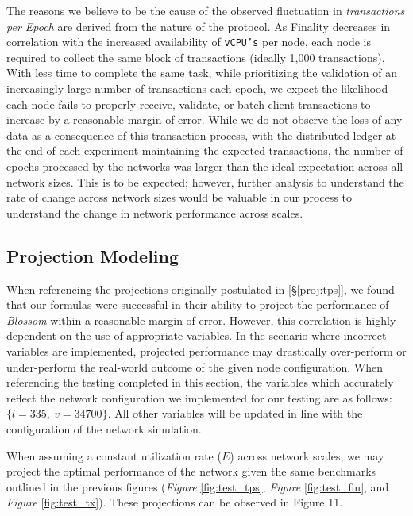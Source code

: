 The reasons we believe to be the cause of the observed fluctuation in \textit{transactions per Epoch} are derived from the nature of the protocol. As Finality decreases in correlation with the increased availability of \texttt{vCPU's} per node, each node is required to collect the same block of transactions (ideally 1,000 transactions). With less time to complete the same task, while prioritizing the validation of an increasingly large number of transactions each epoch, we expect the likelihood each node fails to properly receive, validate, or batch client transactions to increase by a reasonable margin of error. While we do not observe the loss of any data as a consequence of this transaction process, with the distributed ledger at the end of each experiment maintaining the expected transactions, the number of epochs processed by the networks was larger than the ideal expectation across all network sizes. This is to be expected; however, further analysis to understand the rate of change across network sizes would be valuable in our process to understand the change in network performance across scales.

\subsection{Projection Modeling}\label{bench:mod}
When referencing the projections originally postulated in \textit{} [\S\ref{proj:tps}], we found that our formulas were successful in their ability to project the performance of \textit{Blossom} within a reasonable margin of error. However, this correlation is highly dependent on the use of appropriate variables. In the scenario where incorrect variables are implemented, projected performance may drastically over-perform or under-perform the real-world outcome of the given node configuration. When referencing the testing completed in this section, the variables which accurately reflect the network configuration we implemented for our testing are as follows: \(\{
l = 335, \
v = 34700
\}\). All other variables will be updated in line with the configuration of the network simulation.

When assuming a constant utilization rate ($E$) across network scales, we may project the optimal performance of the network given the same benchmarks outlined in the previous figures (\textit{Figure} \ref{fig:test_tps}, \textit{Figure} \ref{fig:test_fin}, and \textit{Figure} \ref{fig:test_tx}). These projections can be observed in Figure 11.

